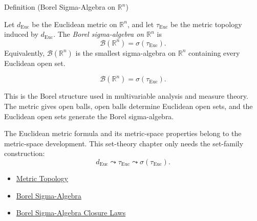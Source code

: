 \begin{definitionbox}{Definition (Borel Sigma-Algebra on \(\mathbb R^n\))}
\begin{definition}\label{def:borel-sigma-algebra-rn}
Let \(d_{\mathrm{Euc}}\) be the Euclidean metric on \(\mathbb R^n\), and let
\(\tau_{\mathrm{Euc}}\) be the metric topology induced by \(d_{\mathrm{Euc}}\).
The \emph{Borel sigma-algebra on \(\mathbb R^n\)} is
\[
  \mathcal B(\mathbb R^n)
  =
  \sigma(\tau_{\mathrm{Euc}}).
\]
Equivalently, \(\mathcal B(\mathbb R^n)\) is the smallest sigma-algebra on
\(\mathbb R^n\) containing every Euclidean open set.
\end{definition}
\end{definitionbox}

\begin{remark*}
\[
\mathcal B(\mathbb R^n)=\sigma(\tau_{\mathrm{Euc}}).
\]
\end{remark*}

\begin{remark*}[Interpretation]
This is the Borel structure used in multivariable analysis and measure theory.
The metric gives open balls, open balls determine Euclidean open sets, and the
Euclidean open sets generate the Borel sigma-algebra.
\end{remark*}

\begin{remark*}[Exposition]
The Euclidean metric formula and its metric-space properties belong to the
metric-space development.  This set-theory chapter only needs the set-family
construction:
\[
  d_{\mathrm{Euc}}
  \leadsto
  \tau_{\mathrm{Euc}}
  \leadsto
  \sigma(\tau_{\mathrm{Euc}}).
\]
\end{remark*}


\begin{dependencies}
\begin{itemize}
  \item \hyperref[def:metric-topology]{Metric Topology}
  \item \hyperref[def:borel-sigma-algebra]{Borel Sigma-Algebra}
  \item \hyperref[thm:borel-sigma-algebra-closure-laws]{Borel Sigma-Algebra Closure Laws}
\end{itemize}
\end{dependencies}
